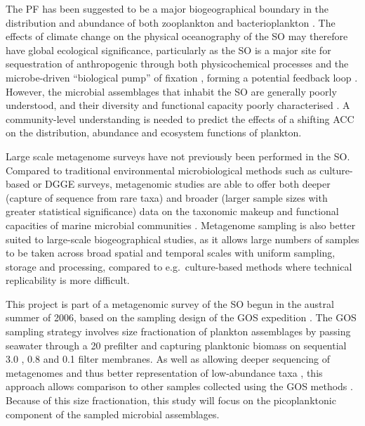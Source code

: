 The \ac{PF} has been suggested to be a major biogeographical boundary in the distribution and abundance of both zooplankton \cite{Chiba:2001un,Hunt:2001vp,Esper:2002ui,Ward:2003db} and bacterioplankton \cite{Selje:2004ka,Abell:2005ji,Giebel:2009hr,Weber:2010fi}.
The effects of climate change on the physical oceanography of the \ac{SO} may therefore have global ecological significance, particularly as the \ac{SO} is a major site for sequestration of anthropogenic  \cite{Sabine:2004fz,MikaloffFletcher:2006ct} through both physicochemical processes and the microbe-driven ``biological pump'' of  fixation \cite{Thomalla:2011hi}, forming a potential feedback loop \cite{Cox:2000ko}.
However, the microbial assemblages that inhabit the \ac{SO} are generally poorly understood, and their diversity and functional capacity poorly characterised \citep[reviewed in][]{Murray:2007db}.
A community-level understanding is needed to predict the effects of a shifting \ac{ACC} on the distribution, abundance and ecosystem functions of plankton.

Large scale metagenome surveys have not previously been performed in the \ac{SO}.
Compared to traditional environmental microbiological methods such as culture-based or DGGE surveys, metagenomic studies are able to offer both deeper (capture of sequence from rare taxa) and broader (larger sample sizes with greater statistical significance) data on the taxonomic makeup and functional capacities of marine microbial communities \citep[e.g.][]{Rusch:2007ez,Angly:2006wf,Dinsdale:2008cd}.
Metagenome sampling is also better suited to large-scale biogeographical studies, as it allows large numbers of samples to be taken across broad spatial and temporal scales with uniform sampling, storage and processing, compared to e.g.\ culture-based methods where technical replicability is more difficult.

This project is part of a metagenomic survey of the \ac{SO} begun in the austral summer of 2006, based on the sampling design of the \ac{GOS} expedition \cite{Rusch:2007ez}.
The \ac{GOS} sampling strategy involves size fractionation of plankton assemblages by passing seawater through a 20 \micron{} prefilter and capturing planktonic biomass on sequential 3.0 \micron{}, 0.8 \micron{} and 0.1 \micron{} filter membranes.
As well as allowing deeper sequencing of metagenomes and thus better representation of low-abundance taxa \cite{Rusch:2007ez}, this approach allows comparison to other samples collected using the \ac{GOS} methods \citep[e.g.][]{Brown:2012gna}.
Because of this size fractionation, this study will focus on the picoplanktonic component of the sampled microbial assemblages.

